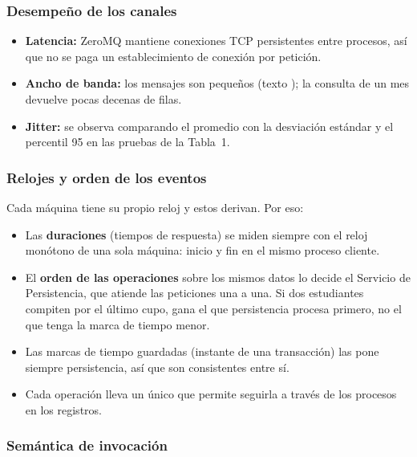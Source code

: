 \subsubsection{Desempeño de los canales}

\begin{itemize}
    \item \textbf{Latencia:} ZeroMQ mantiene conexiones TCP persistentes entre
          procesos, así que no se paga un establecimiento de conexión por petición.
    \item \textbf{Ancho de banda:} los mensajes son pequeños (texto
          ); la consulta de un mes devuelve pocas decenas de filas.
    \item \textbf{Jitter:} se observa comparando el promedio con la desviación
          estándar y el percentil 95 en las pruebas de la Tabla~1.
\end{itemize}

\subsubsection{Relojes y orden de los eventos}

Cada máquina tiene su propio reloj y estos derivan. Por eso:
\begin{itemize}
    \item Las \textbf{duraciones} (tiempos de respuesta) se miden siempre con el reloj
          monótono de una sola máquina: inicio y fin en el mismo proceso cliente.
    \item El \textbf{orden de las operaciones} sobre los mismos datos lo decide el
          Servicio de Persistencia, que atiende las peticiones una a una. Si dos
          estudiantes compiten por el último cupo, gana el que persistencia procesa
          primero, no el que tenga la marca de tiempo menor.
    \item Las marcas de tiempo guardadas (instante de una transacción) las pone
          siempre persistencia, así que son consistentes entre sí.
    \item Cada operación lleva un  único que permite seguirla a
          través de los procesos en los registros.
\end{itemize}

\subsubsection{Semántica de invocación}
\label{sec:semantica}

